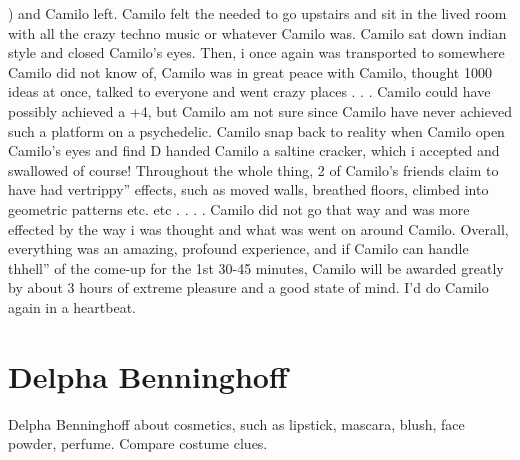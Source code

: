 \documentclass[12pt]{book}
\begin{document}
) and Camilo left. Camilo felt the needed to go upstairs and sit in the lived room with all the crazy techno music or whatever Camilo was. Camilo sat down indian style and closed Camilo's eyes. Then, i once again was transported to somewhere Camilo did not know of, Camilo was in great peace with Camilo, thought 1000 ideas at once, talked to everyone and went crazy places . . .  Camilo could have possibly achieved a +4, but Camilo am not sure since Camilo have never achieved such a platform on a psychedelic. Camilo snap back to reality when Camilo open Camilo's eyes and find D handed Camilo a saltine cracker, which i accepted and swallowed of course! Throughout the whole thing, 2 of Camilo's friends claim to have had vertrippy'' effects, such as moved walls, breathed floors, climbed into geometric patterns etc. etc . . .  . Camilo did not go that way and was more effected by the way i was thought and what was went on around Camilo. Overall, everything was an amazing, profound experience, and if Camilo can handle thhell'' of the come-up for the 1st 30-45 minutes, Camilo will be awarded greatly by about 3 hours of extreme pleasure and a good state of mind. I'd do Camilo again in a heartbeat.



\chapter{Delpha Benninghoff}

Delpha Benninghoff about cosmetics, such as lipstick, mascara, blush, face powder, perfume. Compare costume clues.
\end{document}
